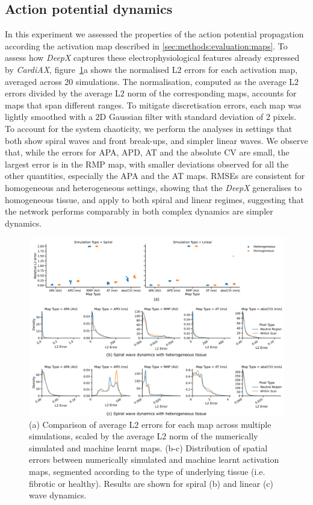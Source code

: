 \documentclass[utf8]{frontiersSCNS} %
\begin{document}
\subsection{Action potential dynamics}
\label{sec:results:maps}
In this experiment we assessed the properties of the action potential propagation according the activation map described in \ref{sec:methods:evaluation:maps}.
To assess how \textit{DeepX} captures these electrophysiological features already expressed by \textit{CardiAX}, figure~\ref{fig:11}a shows the normalised L$2$ errors for each activation map, averaged across 20 simulations. The normalisation, computed as the average L$2$ errors divided by the average L$2$ norm of the corresponding maps, accounts for maps that span different ranges.
To mitigate discretisation errors, each map was lightly smoothed with a $2$D Gaussian filter with standard deviation of $2$ pixels.
To account for the system chaoticity, we perform the analyses in settings that both show spiral waves and front break-ups, and simpler linear waves.
We observe that, while the errors for APA, APD, AT and the absolute CV are small, the largest error is in the RMP map, with smaller deviations observed for all the other quantities, especially the APA and the AT maps.
RMSEs are consistent for homogeneous and heterogeneous settings, showing that the \textit{DeepX} generalises to homogeneous tissue, and apply to both spiral and linear regimes, suggesting that the network performs comparably in both complex dynamics are simpler dynamics.

\begin{figure}[!htp]
\centering
\includegraphics[width=.9\textwidth]{Figure-11.png}
\caption{(a) Comparison of average L$2$ errors for each map across multiple simulations, scaled by the average L$2$ norm of the numerically simulated and machine learnt maps. (b-c) Distribution of spatial errors between numerically simulated and machine learnt activation maps, segmented according to the type of underlying tissue (i.e. fibrotic or healthy). Results are shown for spiral (b) and linear (c) wave dynamics.
}
\label{fig:11}
\end{figure}
\end{document}
